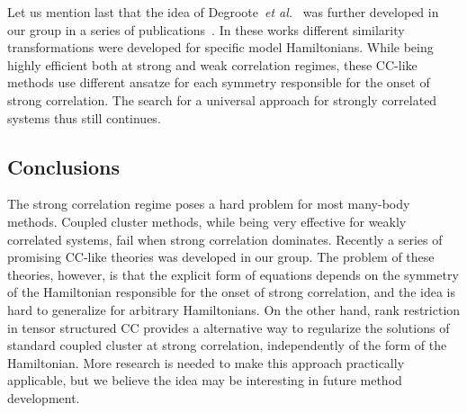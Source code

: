 Let us mention last that the idea of Degroote~\emph{et 
al.}~\cite{degroote2016polynomial} was further developed in our group in a 
series of publications~\cite{degroote2016polynomial, gomez2017attenuated, 
qiu2017projected2, hermes2017combining}. In these works different 
similarity transformations were developed for specific model Hamiltonians. While 
being highly efficient both at strong and weak correlation regimes, these
CC-like methods use different ansatze for each symmetry responsible for 
the onset of strong correlation. The search for a universal approach for
strongly correlated systems thus still continues.

\subsection{Conclusions}
The strong correlation regime poses a hard problem for most many-body methods. 
Coupled cluster methods, while being very effective for weakly correlated 
systems, fail when strong correlation dominates. Recently a series of 
promising CC-like theories was developed in our 
group.\cite{degroote2016polynomial, gomez2017attenuated, 
qiu2017projected2, hermes2017combining} 
The problem of these theories, however, is that the explicit form of equations 
depends on the symmetry of the Hamiltonian responsible for the onset of strong 
correlation, and the idea is hard to generalize for arbitrary Hamiltonians. On 
the other hand, rank restriction in tensor structured CC provides a alternative 
way to regularize the solutions of standard coupled cluster at strong 
correlation, independently of the form of the Hamiltonian. More research is 
needed to make this approach practically applicable, but we believe the idea 
may be interesting in future method development.